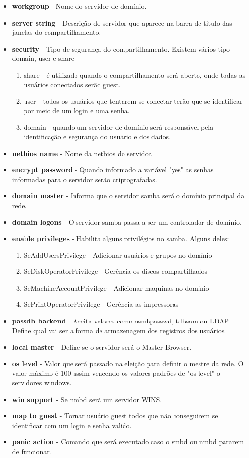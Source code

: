 \begin{itemize}
	\item \textbf{workgroup} - Nome do servidor de domínio.
	\item \textbf{server string} - Descrição do servidor que aparece na barra de titulo das janelas do compartilhamento.
	\item \textbf{security} - Tipo de segurança do compartilhamento. Existem vários tipo domain, user e share.
		\begin{enumerate}
			\item {share}  - é utilizado quando o compartilhamento será aberto, onde todas as usuários conectados serão guest.
			\item {user} - todos os usuários que tentarem se conectar terão que se identificar por meio de um login e uma senha.
			\item {domain} - quando um servidor de domínio será responsável pela identificação e segurança do usuário e dos dados.
		\end{enumerate}
	\item \textbf{netbios name} - Nome da netbios do servidor.
	\item \textbf{encrypt password} - Quando informado a variável "yes" as senhas informadas para o servidor serão criptografadas.
	\item \textbf{domain master} - Informa que o servidor samba será o domínio principal da rede.
	\item \textbf{domain logons} - O servidor samba passa a ser um controlador de domínio.
	\item \textbf{enable privileges} - Habilita alguns privilégios no samba. Alguns deles:
		\begin{enumerate}
			\item {SeAddUsersPrivilege} - Adicionar usuários e grupos no domínio 
			\item {SeDiskOperatorPrivilege} - Gerência os discos compartilhados 
			\item {SeMachineAccountPrivilege} - Adicionar maquinas no domínio 
			\item {SePrintOperatorPrivilege} - Gerência as impressoras
		\end{enumerate}
	\item \textbf{passdb backend} - Aceita valores como  osmbpasswd, tdbsam ou LDAP. Define qual vai ser a forma de armazenagem dos registros dos usuários.
	\item \textbf{local master} - Define se o servidor será o Master Browser.
	\item \textbf{os level} - Valor que será passado na eleição para definir o mestre da rede. O valor máximo é 100 assim vencendo os valores padrões de "os level" o servidores windows.
	\item \textbf{win support} - Se nmbd será um servidor WINS.
	\item \textbf{map to guest} - Tornar usuário guest todos que não conseguirem se identificar com um login e senha valido.
	\item \textbf{panic action} - Comando que será executado caso o smbd ou nmbd pararem de funcionar.
\end{itemize}

